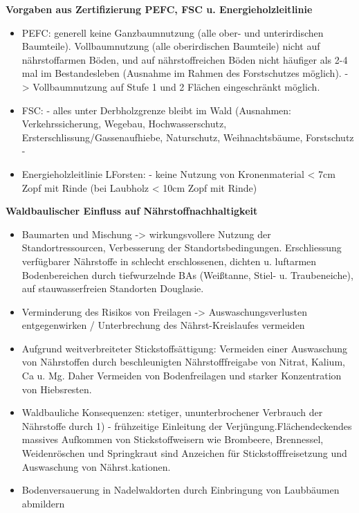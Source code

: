 \documentclass{article}
\begin{document}
\textbf{Vorgaben aus Zertifizierung PEFC, FSC u. Energieholzleitlinie}\\

\begin{itemize}
	
	\item PEFC: generell keine Ganzbaumnutzung (alle ober- und unterirdischen Baumteile). Vollbaumnutzung (alle oberirdischen Baumteile) nicht auf nährstoffarmen Böden, und auf nährstoffreichen Böden nicht häufiger als 2-4 mal im Bestandesleben (Ausnahme im Rahmen des Forstschutzes möglich). -> Vollbaumnutzung auf Stufe 1 und 2 Flächen eingeschränkt möglich.
	
	\item FSC: - alles unter Derbholzgrenze bleibt im Wald (Ausnahmen: Verkehrssicherung, Wegebau, Hochwasserschutz, Ersterschlissung/Gassenaufhiebe, Naturschutz, Weihnachtsbäume, Forstschutz - 
	
	\item Energieholzleitlinie LForsten: - keine Nutzung von Kronenmaterial < 7cm Zopf mit Rinde (bei Laubholz < 10cm Zopf mit Rinde)

\end{itemize} 


\textbf{Waldbaulischer Einfluss auf Nährstoffnachhaltigkeit}\\

\begin{itemize}
	
	\item Baumarten und Mischung -> wirkungsvollere Nutzung der Standortressourcen, Verbesserung der Standortsbedingungen. Erschliessung verfügbarer Nährstoffe in schlecht erschlossenen, dichten u. luftarmen Bodenbereichen durch tiefwurzelnde BAs (Weißtanne, Stiel- u. Traubeneiche), auf stauwasserfreien Standorten Douglasie.
	
	\item Verminderung des Risikos von Freilagen -> Auswaschungsverlusten entgegenwirken / Unterbrechung des Nährst-Kreislaufes vermeiden
	
	\item Aufgrund weitverbreiteter Stickstoffsättigung: Vermeiden einer Auswaschung von Nährstoffen durch beschleunigten Nährstofffreigabe von Nitrat, Kalium, Ca u. Mg. Daher Vermeiden von Bodenfreilagen und starker Konzentration von Hiebsresten.
	
	\item Waldbauliche Konsequenzen: stetiger, ununterbrochener Verbrauch der Nährstoffe durch 1) - frühzeitige Einleitung der Verjüngung.Flächendeckendes massives Aufkommen von Stickstoffweisern wie Brombeere, Brennessel, Weidenröschen und Springkraut sind Anzeichen für Stickstofffreisetzung und Auswaschung von Nährst.kationen.
	
	\item Bodenversauerung in Nadelwaldorten durch Einbringung von Laubbäumen abmildern

\end{itemize} 
\end{document}
